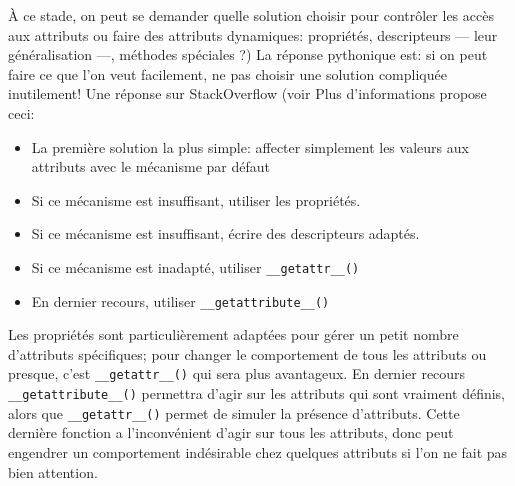 \documentclass[a4paper, 10pt]{article}
\begin{document}
À ce stade, on peut se demander quelle solution choisir pour contrôler les accès aux attributs ou faire des attributs dynamiques: propriétés, descripteurs --- leur généralisation ---, méthodes spéciales ?) La réponse pythonique est: si on peut faire ce que l'on veut facilement, ne pas choisir une solution compliquée inutilement! Une réponse sur StackOverflow (voir \og Plus d'informations \fg{} propose ceci:
\begin{itemize}
    \item La première solution la plus simple: affecter simplement les valeurs aux attributs avec le mécanisme par défaut
    \item Si ce mécanisme est insuffisant, utiliser les propriétés.
    \item Si ce mécanisme est insuffisant, écrire des descripteurs adaptés.
    \item Si ce mécanisme est inadapté, utiliser \texttt{__getattr__()}
    \item En dernier recours, utiliser \texttt{__getattribute__()}
\end{itemize}

Les propriétés sont particulièrement adaptées pour gérer un petit nombre d'attributs spécifiques; pour changer le comportement de tous les attributs ou presque, c'est \texttt{__getattr__()} qui sera plus avantageux. En dernier recours \texttt{__getattribute__()} permettra d'agir sur les attributs qui sont vraiment définis, alors que \texttt{__getattr__()} permet de simuler la présence d'attributs. Cette dernière fonction a l'inconvénient d'agir sur tous les attributs, donc peut engendrer un comportement indésirable chez quelques attributs si l'on ne fait pas bien attention.
\end{document}
